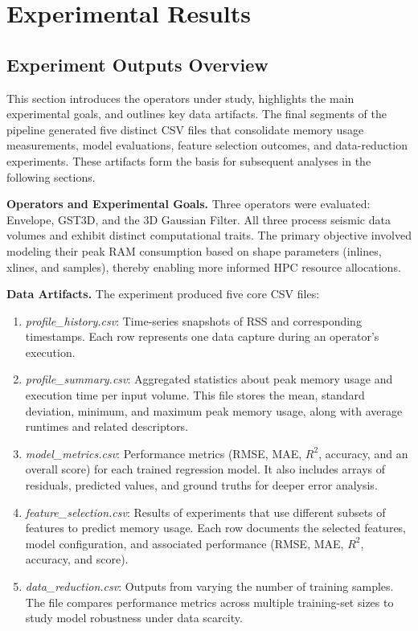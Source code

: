 \section{Experimental Results}
\label{sec:pmc-results}

\subsection{Experiment Outputs Overview}
\label{subsec:pmc-results-experiment-outputs-overview}

This section introduces the operators under study, highlights the main experimental goals, and outlines key data artifacts.
The final segments of the pipeline generated five distinct \ac{CSV} files that consolidate memory usage measurements, model evaluations, feature selection outcomes, and data-reduction experiments.
These artifacts form the basis for subsequent analyses in the following sections.

\vspace{1em}
\noindent
\textbf{Operators and Experimental Goals.}
Three operators were evaluated: Envelope, \ac{GST3D}, and the 3D Gaussian Filter.
All three process seismic data volumes and exhibit distinct computational traits.
The primary objective involved modeling their peak \ac{RAM} consumption based on shape parameters (inlines, xlines, and samples), thereby enabling more informed \ac{HPC} resource allocations.

\vspace{1em}
\noindent
\textbf{Data Artifacts.}
The experiment produced five core \ac{CSV} files:
\begin{enumerate}
    \item \emph{profile\_history.csv}:
    Time-series snapshots of \ac{RSS} and corresponding timestamps.
    Each row represents one data capture during an operator’s execution.
    \item \emph{profile\_summary.csv}:
    Aggregated statistics about peak memory usage and execution time per input volume.
    This file stores the mean, standard deviation, minimum, and maximum peak memory usage, along with average runtimes and related descriptors.
    \item \emph{model\_metrics.csv}:
    Performance metrics (\ac{RMSE}, \ac{MAE}, $R^2$, accuracy, and an overall score) for each trained regression model.
    It also includes arrays of residuals, predicted values, and ground truths for deeper error analysis.
    \item \emph{feature\_selection.csv}:
    Results of experiments that use different subsets of features to predict memory usage.
    Each row documents the selected features, model configuration, and associated performance (\ac{RMSE}, \ac{MAE}, $R^2$, accuracy, and score).
    \item \emph{data\_reduction.csv}:
    Outputs from varying the number of training samples.
    The file compares performance metrics across multiple training-set sizes to study model robustness under data scarcity.
\end{enumerate}

